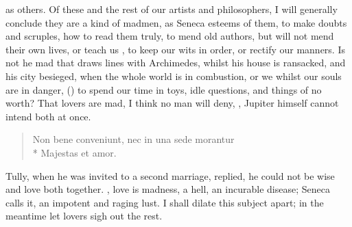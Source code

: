 {as others. Of these and the rest of our artists and philosophers, I
will generally conclude they are a kind of madmen, as  Seneca
esteems of them, to make doubts and scruples, how to read them truly,
to mend old authors, but will not mend their own lives, or teach us
, to keep our wits in order, or rectify our manners.  Is not he mad that
draws lines with Archimedes, whilst his house is ransacked, and his
city besieged, when the whole world is in combustion, or we whilst our
souls are in danger, () to spend our time in
toys, idle questions, and things of no worth?
That lovers are mad, I think no man will deny, , Jupiter himself cannot intend both at
once.

\begin{verse}
\textlatin{Non bene conveniunt, nec in una sede morantur}\\*
\textlatin{Majestas et amor.}
\end{verse}

Tully, when he was invited to a second marriage, replied, he could not
 be wise and love both together. , love is madness, a
hell, an incurable disease;  Seneca
calls it, an impotent and raging lust. I shall dilate this subject
apart; in the meantime let lovers sigh out the rest.

}
